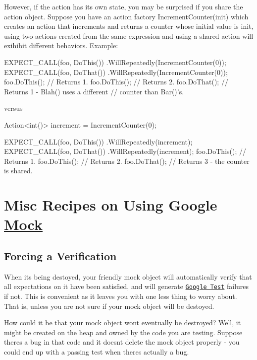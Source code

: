 However, if the action has its own state, you may be surprised if you share the action object. Suppose you have an action factory {\ttfamily Increment\+Counter(init)} which creates an action that increments and returns a counter whose initial value is {\ttfamily init}, using two actions created from the same expression and using a shared action will exihibit different behaviors. Example\+:


\begin{DoxyCode}
EXPECT\_CALL(foo, DoThis())
    .WillRepeatedly(IncrementCounter(0));
EXPECT\_CALL(foo, DoThat())
    .WillRepeatedly(IncrementCounter(0));
foo.DoThis();  // Returns 1.
foo.DoThis();  // Returns 2.
foo.DoThat();  // Returns 1 - Blah() uses a different
               // counter than Bar()'s.
\end{DoxyCode}


versus


\begin{DoxyCode}
Action<int()> increment = IncrementCounter(0);

EXPECT\_CALL(foo, DoThis())
    .WillRepeatedly(increment);
EXPECT\_CALL(foo, DoThat())
    .WillRepeatedly(increment);
foo.DoThis();  // Returns 1.
foo.DoThis();  // Returns 2.
foo.DoThat();  // Returns 3 - the counter is shared.
\end{DoxyCode}


\section*{Misc Recipes on Using Google \hyperlink{class_mock}{Mock}}

\subsection*{Forcing a Verification}

When it\textquotesingle{}s being destoyed, your friendly mock object will automatically verify that all expectations on it have been satisfied, and will generate \href{http://code.google.com/p/googletest/}{\tt Google Test} failures if not. This is convenient as it leaves you with one less thing to worry about. That is, unless you are not sure if your mock object will be destoyed.

How could it be that your mock object won\textquotesingle{}t eventually be destroyed? Well, it might be created on the heap and owned by the code you are testing. Suppose there\textquotesingle{}s a bug in that code and it doesn\textquotesingle{}t delete the mock object properly -\/ you could end up with a passing test when there\textquotesingle{}s actually a bug.

